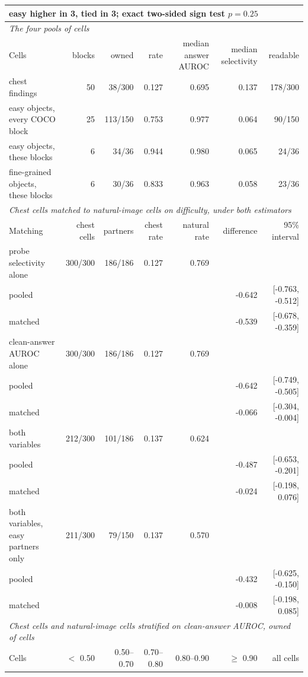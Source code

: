 \documentclass{article}
\begin{document}
\begin{table}[htbp]
{\begin{tabular}{lrrrrrr}
\multicolumn{7}{l}{easy higher in 3, tied in 3; exact two-sided sign test $p=0.25$} \\
\midrule
\multicolumn{7}{l}{\textit{The four pools of cells}} \\
Cells & blocks & owned & rate & median answer AUROC & median selectivity & readable \\
\midrule
chest findings & 50 & 38/300 & 0.127 & 0.695 & 0.137 & 178/300 \\
easy objects, every COCO block & 25 & 113/150 & 0.753 & 0.977 & 0.064 & 90/150 \\
easy objects, these blocks & 6 & 34/36 & 0.944 & 0.980 & 0.065 & 24/36 \\
fine-grained objects, these blocks & 6 & 30/36 & 0.833 & 0.963 & 0.058 & 23/36 \\
\midrule
\multicolumn{7}{l}{\textit{Chest cells matched to natural-image cells on difficulty, under both estimators}} \\
Matching & chest cells & partners & chest rate & natural rate & difference & 95\% interval \\
\midrule
probe selectivity alone & 300/300 & 186/186 & 0.127 & 0.769 &  &  \\
\quad pooled &  &  &  &  & -0.642 & [-0.763, -0.512] \\
\quad matched &  &  &  &  & -0.539 & [-0.678, -0.359] \\
clean-answer AUROC alone & 300/300 & 186/186 & 0.127 & 0.769 &  &  \\
\quad pooled &  &  &  &  & -0.642 & [-0.749, -0.505] \\
\quad matched &  &  &  &  & -0.066 & [-0.304, -0.004] \\
both variables & 212/300 & 101/186 & 0.137 & 0.624 &  &  \\
\quad pooled &  &  &  &  & -0.487 & [-0.653, -0.201] \\
\quad matched &  &  &  &  & -0.024 & [-0.198, 0.076] \\
both variables, easy partners only & 211/300 & 79/150 & 0.137 & 0.570 &  &  \\
\quad pooled &  &  &  &  & -0.432 & [-0.625, -0.150] \\
\quad matched &  &  &  &  & -0.008 & [-0.198, 0.085] \\
\midrule
\multicolumn{7}{l}{\textit{Chest cells and natural-image cells stratified on clean-answer AUROC, owned of cells}} \\
Cells & $<$ 0.50 & 0.50--0.70 & 0.70--0.80 & 0.80--0.90 & $\geq$ 0.90 & all cells \\

\end{tabular}}
\end{table}
\end{document}
